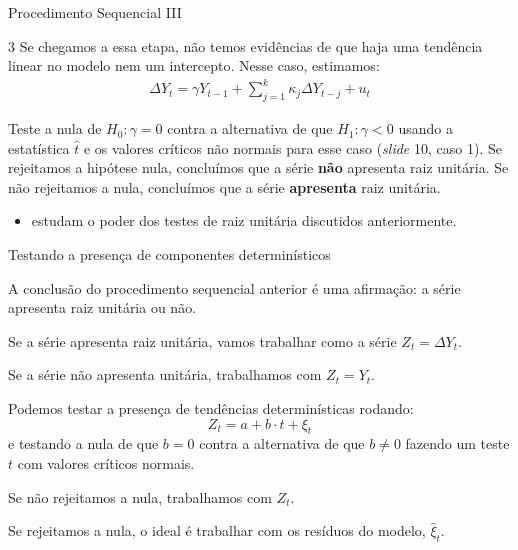 \documentclass[11pt]{beamer}
\newenvironment{wideenumerate}{\enumerate\addtolength{\itemsep}{10pt}}{\endenumerate}
\newenvironment{halfwideitemize}{\itemize\addtolength{\itemsep}{0.5em}}{\enditemize}
\begin{document}
\begin{frame}{Procedimento Sequencial III}
	\begin{wideenumerate}
		\item[3] Se chegamos a essa etapa, não temos evidências de que haja uma tendência linear no modelo nem um intercepto. Nesse caso, estimamos:
		\begin{equation*}
			\begin{aligned}
				\Delta Y_t = \gamma Y_{t-1} +  \sum_{j=1}^k \kappa_j \Delta Y_{t-j} + u_t
			\end{aligned}
		\end{equation*}
		
		Teste a nula de $H_0: \gamma = 0$ contra a alternativa de que $H_1: \gamma < 0$ usando a estatística $\hat{t}$ e os valores críticos não normais para esse caso (\textit{slide} 10, caso 1). Se rejeitamos a hipótese nula, concluímos que a série \textbf{não} apresenta raiz unitária. Se não rejeitamos a nula, concluímos que a série \textbf{apresenta} raiz unitária.
		
	\end{wideenumerate}
	
\end{frame}

\begin{frame}{\citet{Elliott1996} }
	\begin{itemize}
		\item \citet{Elliott1996} estudam o poder dos testes de raiz unitária discutidos anteriormente.
		
	\end{itemize}
\end{frame}

\begin{frame}{Testando a presença de componentes determinísticos}
	\begin{halfwideitemize}
		\item A conclusão do procedimento sequencial anterior é uma afirmação: a série apresenta raiz unitária ou não.
		\item Se a série apresenta raiz unitária, vamos trabalhar como a série $Z_t = \Delta Y_t$.
		\item Se a série não apresenta unitária, trabalhamos com $Z_t = Y_t$.
		\item Podemos testar a presença de tendências determinísticas rodando:
		\begin{equation}
			Z_t = a + b \cdot t + \xi_t
		\end{equation}
		e testando a nula de que $b=0$ contra a alternativa de que $b \neq 0$ fazendo um teste $t$ com valores críticos normais.
		\begin{halfwideitemize}
			\item Se não rejeitamos a nula, trabalhamos com $Z_t$.
			\item Se rejeitamos a nula, o ideal é trabalhar com os resíduos do modelo, $\hat{\xi}_t$.
		\end{halfwideitemize}
	\end{halfwideitemize}
\end{frame}
\end{document}
